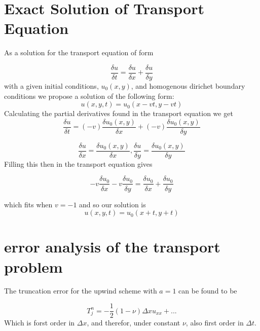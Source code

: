 \documentclass[ twoside,openright,titlepage,numbers=noenddot,headinclude,%
                footinclude=true,cleardoublepage=empty,abstractoff, %
                BCOR=5mm,paper=a4,fontsize=11pt,%
                ngerman,american,%
                ]{scrreprt}
\begin{document}
\section{Exact Solution of Transport Equation}
As a solution for the transport equation of form

\begin{equation}
\frac{\delta u}{\delta t} = \frac{\delta u}{\delta x} + \frac{\delta u}{\delta y}
\end{equation}
with a given initial conditions, $u_0(x,y)$, and homogenous dirichet boundary conditions we propose a solution of the following form:
\begin{equation}
u(x,y,t) = u_0(x-vt,y-vt)
\label{proposal}
\end{equation}
Calculating the partial derivatives found in the transport equation we get
\begin{equation}
\frac{\delta u}{\delta t} =(-v) \frac{\delta u_0(x,y)}{\delta x} +(-v) \frac{\delta u_0(x,y)}{\delta y} 
\end{equation}

\begin{equation}
\frac{\delta u}{\delta x} = \frac{\delta u_0(x,y)}{\delta x} ,\frac{\delta u}{\delta y} = \frac{\delta u_0(x,y)}{\delta y} 
\end{equation}
Filling this then in the transport equation gives

\begin{equation}
-v\frac{\delta u_0}{\delta x}-v\frac{\delta u_0}{\delta y} = \frac{\delta u_0}{\delta x}+\frac{\delta u_0}{\delta y} 
\end{equation}

which fits when $v=-1$ and so our solution is
\begin{equation}
u(x,y,t)=u_0(x+t,y+t)
\end{equation}

\section{error analysis of the transport problem}

The truncation error for the upwind scheme with $a=1$ can be found to be

\begin{equation}
T_j^n = -\frac{1}{2}(1-\nu)\Delta x u_{xx} + ...
\end{equation}
Which is forst order in $\Delta x$, and therefor, under constant $\nu$, also first order in $\Delta t$.
\end{document}
